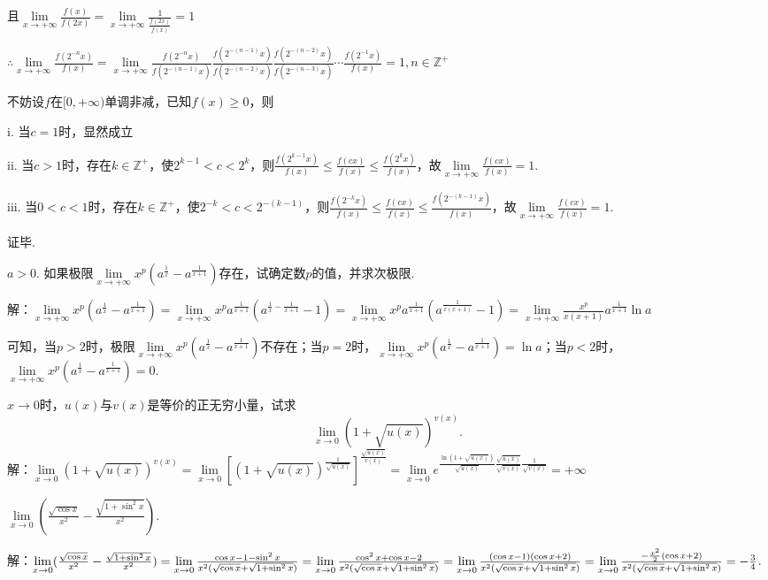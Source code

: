 \documentclass[12pt,UTF8]{ctexart}
\begin{document}
\begin{enumerate}
且$\lim\limits_{x\rightarrow+\infty}\frac{f(x)}{f(2x)}=\lim\limits_{x\rightarrow+\infty}\frac1{\frac{f(2x)}{f(x)}}=1$

$\therefore\lim\limits_{x\rightarrow+\infty}\frac{f(2^{-n}x)}{f(x)}=\lim\limits_{x\rightarrow+\infty}\frac{f(2^{-n}x)}{f(2^{-(n-1)}x)}\frac{f(2^{-(n-1)}x)}{f(2^{-(n-2)}x)}\frac{f(2^{-(n-2)}x)}{f(2^{-(n-3)}x)}\cdots\frac{f(2^{-1}x)}{f(x)}=1,n\in\mathbb Z^+$

不妨设$f$在$[0,+\infty)$单调非减，已知$f(x)\geq0$，则

i. 当$c=1$时，显然成立

ii. 当$c>1$时，存在$k\in\mathbb Z^+$，使$2^{k-1}<c<2^{k}$，则$\frac{f(2^{k-1}x)}{f(x)}\leq\frac{f(cx)}{f(x)}\leq\frac{f(2^{k}x)}{f(x)}$，故$\lim\limits_{x\rightarrow+\infty}\frac{f(cx)}{f(x)}=1$.

iii. 当$0<c<1$时，存在$k\in\mathbb Z^+$，使$2^{-k}<c<2^{-(k-1)}$，则$\frac{f(2^{-k}x)}{f(x)}\leq\frac{f(cx)}{f(x)}\leq\frac{f(2^{-(k-1)}x)}{f(x)}$，故$\lim\limits_{x\rightarrow+\infty}\frac{f(cx)}{f(x)}=1$.

证毕.

$a>0$. 如果极限$\lim\limits_{x\rightarrow+\infty}x^p(a^{\frac1x}-a^{\frac1{x+1}})$存在，试确定数$p$的值，并求次极限.

解：$\lim\limits_{x\rightarrow+\infty}x^p(a^{\frac1x}-a^{\frac1{x+1}})=\lim\limits_{x\rightarrow+\infty}x^pa^{\frac1{x+1}}(a^{\frac1x-\frac1{x+1}}-1)=\lim\limits_{x\rightarrow+\infty}x^pa^{\frac1{x+1}}(a^{\frac1{x(x+1)}}-1)=\lim\limits_{x\rightarrow+\infty}\frac{x^p}{x(x+1)}a^{\frac1{x+1}}\ln a$

可知，当$p>2$时，极限$\lim\limits_{x\rightarrow+\infty}x^p(a^{\frac1x}-a^{\frac1{x+1}})$不存在；当$p=2$时，$\lim\limits_{x\rightarrow+\infty}x^p(a^{\frac1x}-a^{\frac1{x+1}})=\ln a$；当$p<2$时，$\lim\limits_{x\rightarrow+\infty}x^p(a^{\frac1x}-a^{\frac1{x+1}})=0$.

$x\rightarrow0$时，$u(x)$与$v(x)$是等价的正无穷小量，试求
\[
\lim\limits_{x\rightarrow0}(1+\sqrt{u(x)})^{v(x)}.
\]
解：$\lim\limits_{x\rightarrow0}(1+\sqrt{u(x)})^{v(x)}=\lim\limits_{x\rightarrow0}[(1+\sqrt{u(x)})^{\frac1{\sqrt{u(x)}}}]^{\frac{\sqrt{u(x)}}{v(x)}}=\lim\limits_{x\rightarrow0}e^{\frac{\ln(1+\sqrt{u(x)})}{\sqrt{u(x)}}\frac{\sqrt{u(x)}}{\sqrt{v(x)}}\frac1{\sqrt{v(x)}}}=+\infty$

$\lim\limits_{x\rightarrow0}(\frac{\sqrt{\cos x}}{x^2}-\frac{\sqrt{1+\sin^2x}}{x^2})$.

解：$\lim\limits_{x\rightarrow0}(\frac{\sqrt{\cos x}}{x^2}-\frac{\sqrt{1+\sin^2x}}{x^2})=\lim\limits_{x\rightarrow0}\frac{\cos x-1-\sin^2x}{x^2(\sqrt{\cos x}+\sqrt{1+\sin^2x})}=\lim\limits_{x\rightarrow0}\frac{\cos^2x+\cos x-2}{x^2(\sqrt{\cos x}+\sqrt{1+\sin^2x})}\\
=\lim\limits_{x\rightarrow0}\frac{(\cos x-1)(\cos x+2)}{x^2(\sqrt{\cos x}+\sqrt{1+\sin^2x})}=\lim\limits_{x\rightarrow0}\frac{-\frac{x^2}2(\cos x+2)}{x^2(\sqrt{\cos x}+\sqrt{1+\sin^2x})}=-\frac34$.


\end{enumerate}
\end{document}
